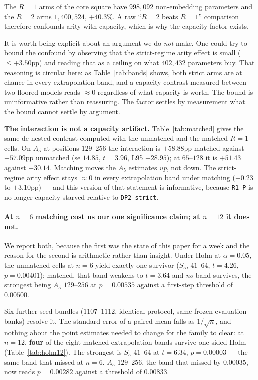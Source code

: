 \documentclass[10pt,twocolumn]{article}
\begin{document}
The $R{=}1$ arms of the core square have $998{,}092$ non-embedding parameters
and the $R{=}2$ arms $1{,}400{,}524$, $+40.3\%$. A raw ``$R{=}2$ beats $R{=}1$''
comparison therefore confounds arity with capacity, which is why the capacity
factor exists.

It is worth being explicit about an argument we do \emph{not} make. One could try
to bound the confound by observing that the strict-regime arity effect is small
($\le +3.50$pp) and reading that as a ceiling on what $402{,}432$ parameters buy.
That reasoning is circular here: as Table~\ref{tab:bands} shows, both strict arms
are at chance in every extrapolation band, and a capacity contrast measured
between two floored models reads $\approx0$ regardless of what capacity is worth.
The bound is uninformative rather than reassuring. The factor settles by
measurement what the bound cannot settle by argument.

\textbf{The interaction is not a capacity artifact.} Table~\ref{tab:matched}
gives the same de-nested contrast computed with the unmatched and the matched
$R{=}1$ cells. On $A_5$ at positions $129$--$256$ the interaction is $+58.88$pp
matched against $+57.09$pp unmatched (se $14.85$, $t=3.96$, L95 $+28.95$); at
$65$--$128$ it is $+51.43$ against $+30.14$. Matching moves the $A_5$ estimates
\emph{up}, not down. The strict-regime arity effect stays $\approx0$ in every
extrapolation band under matching ($-0.23$ to $+3.10$pp) --- and this version of
that statement is informative, because \texttt{R1-P} is no longer
capacity-starved relative to \texttt{DP2-strict}.

\paragraph{At $n=6$ matching cost us our one significance claim; at $n=12$ it
does not.} We report both, because the first was the state of this paper for a
week and the reason for the second is arithmetic rather than insight. Under Holm
at $\alpha=0.05$, the unmatched cells at $n=6$ yield exactly one survivor ($S_5$,
$41$--$64$, $t=4.26$, $p=0.00401$); matched, that band weakens to $t=3.64$ and
\emph{no} band survives, the strongest being $A_5$ $129$--$256$ at $p=0.00535$
against a first-step threshold of $0.00500$.

Six further seed bundles ($1107$--$1112$, identical protocol, same frozen
evaluation banks) resolve it. The standard error of a paired mean falls as
$1/\sqrt{n}$, and nothing about the point estimates needed to change for the
family to clear: at $n=12$, \textbf{four} of the eight matched extrapolation
bands survive one-sided Holm (Table~\ref{tab:holm12}). The strongest is $S_5$
$41$--$64$ at $t=6.34$, $p=0.00003$ --- the same band that missed at $n=6$. $A_5$
$129$--$256$, the band that missed by $0.00035$, now reads $p=0.00282$ against a
threshold of $0.00833$.
\end{document}

